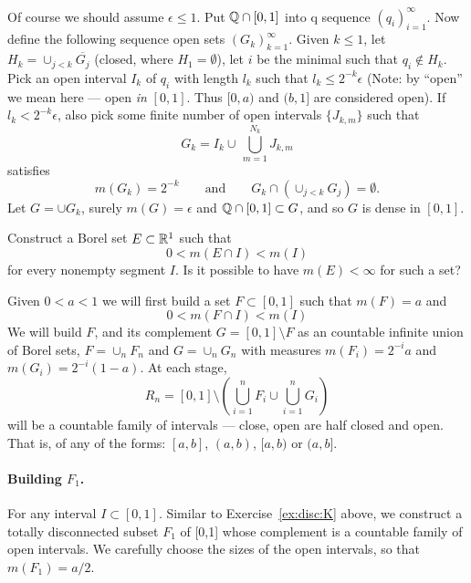 \begin{enumerate}
Of course we should assume \(\epsilon \leq 1\).
Put \(\mathbb{Q}\cap[0,1]\) into q sequence \((q_i)_{i=1}^\infty\).
Now define the following sequence open sets \((G_k)_{k=1}^\infty\).
Given \(k\leq 1\), let \(H_k =  \cup_{j<k} \overline{G_j}\)
(closed, where \(H_1 = \emptyset\)),
let $i$ be the minimal such that \(q_i\notin H_k\).
Pick an open interval \(I_k\) of \(q_i\) with length \(l_k\)
such that \(l_k \leq 2^{-k}\epsilon\)
(Note: by ``open'' we mean here --- open \emph{in} \([0,1]\).
Thus \([0,a)\) and \((b,1]\) are considered open).
If \(l_k < 2^{-k} \epsilon\), also pick some finite number
of open intervals \(\{J_{k,m}\}\) such that
\begin{equation*}
G_k = I_k \cup\,\bigcup_{m=1}^{N_k} J_{k,m}
\end{equation*}
satisfies
\begin{equation*}
m(G_k) = 2^{-k} \qquad \textrm{and} \qquad
  G_k \cap \left(\cup_{j<k} G_j\right) = \emptyset.
\end{equation*}
Let \(G = \cup G_k\), surely \(m(G) = \epsilon\) and \(\mathbb{Q}\cap [0,1] \subset G\),
and so $G$ is dense in \([0,1]\).


\begin{excopy}
Construct a Borel set \(E\subset \mathbb{R}^1\) such that
\begin{equation*}
 0 < m(E\cap I) < m(I)
\end{equation*}
for every nonempty segment $I$. Is it possible to have \(m(E) < \infty\)
for such a set?
\end{excopy}


Given \(0<a<1\) we will first build a set \(F\subset [0,1]\) such that
\(m(F) = a\) and
\begin{equation*}
0 < m(F\cap I) < m(I)
\end{equation*}
We will build $F$, and its complement \(G = [0,1] \setminus F\)
as an countable infinite union of Borel sets,
\(F = \cup_n F_n\)
and
\(G = \cup_n G_n\)
with measures \(m(F_i) = 2^{-i}a\) and \(m(G_i) = 2^{-i}(1-a)\).
At each stage,
\begin{equation*}
 R_n = [0,1] \setminus
       \left( \bigcup_{i=1}^n F_i \cup \bigcup_{i=1}^n G_i\right)
\end{equation*}
will be a countable family of intervals ---
close, open are half closed and open. That is, of
any of the forms:
\([a,b]\),
\((a,b)\),
\([a,b)\) or
\((a,b]\).

\paragraph{Building \(F_1\).}
For any interval \(I\subset[0,1]\).
Similar to Exercise~\ref{ex:disc:K} above, we construct a totally disconnected
subset \(F_1\) of [0,1]
whose complement is a countable family of open intervals.
We carefully choose the sizes of the open intervals, so
that \(m(F_1) = a/2\).


\end{enumerate}
